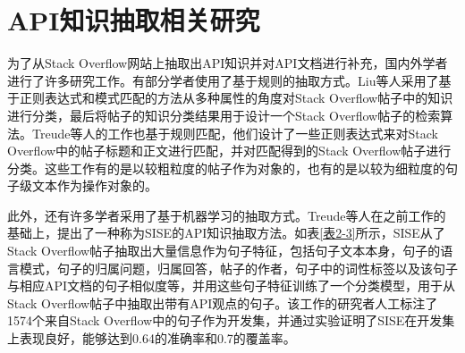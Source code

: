 \section{API知识抽取相关研究}
为了从Stack Overflow网站上抽取出API知识并对API文档进行补充，国内外学者进行了许多研究工作。有部分学者使用了基于规则的抽取方式。Liu等人\cite{DBLP:conf/internetware/Liu0JMYZ18}采用了基于正则表达式和模式匹配的方法从多种属性的角度对Stack Overflow帖子中的知识进行分类，最后将帖子的知识分类结果用于设计一个Stack Overflow帖子的检索算法。Treude等人\cite{DBLP:conf/icse/TreudeBS11}的工作也基于规则匹配，他们设计了一些正则表达式来对Stack Overflow中的帖子标题和正文进行匹配，并对匹配得到的Stack Overflow帖子进行分类。这些工作有的是以较粗粒度的帖子作为对象的，也有的是以较为细粒度的句子级文本作为操作对象的。

此外，还有许多学者采用了基于机器学习的抽取方式。Treude等人\cite{DBLP:conf/icse/TreudeR16}在之前工作的基础上，提出了一种称为SISE的API知识抽取方法。如表\ref{表2-3}所示，SISE从了Stack Overflow帖子抽取出大量信息作为句子特征，包括句子文本本身，句子的语言模式，句子的归属问题，归属回答，帖子的作者，句子中的词性标签以及该句子与相应API文档的句子相似度等，并用这些句子特征训练了一个分类模型，用于从Stack Overflow帖子中抽取出带有API观点的句子。该工作的研究者人工标注了1574个来自Stack Overflow中的句子作为开发集，并通过实验证明了SISE在开发集上表现良好，能够达到0.64的准确率和0.7的覆盖率。

